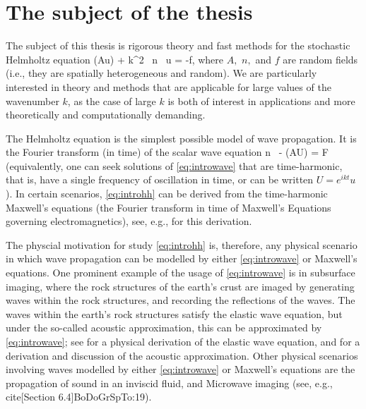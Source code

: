 \section{The subject of the thesis}

The subject of this thesis is rigorous theory and fast methods for the stochastic Helmholtz equation
\beq\label{eq:introhh}
\grad \cdot \mleft(A\grad u\mright) + k^2 \, n \, u = -f,
\eeq
where $A,$ $n,$ and $f$ are random fields (i.e., they are spatially heterogeneous and random). We are particularly interested in theory and methods that are applicable for large values of the wavenumber $k$, as the case of large $k$ is both of interest in applications and more theoretically and computationally demanding.

The Helmholtz equation is the simplest possible model of wave propagation. It is the Fourier transform (in time) of the scalar wave equation
\beq\label{eq:introwave}
n \,  - \grad \cdot\mleft(A\grad U\mright) = F
\eeq
(equivalently, one can seek solutions of \eqref{eq:introwave} that are time-harmonic, that is, have a single frequency of oscillation in time, or can be written $U = e^{ikt}u$). In certain scenarios, 
\eqref{eq:introhh} can be derived from the time-harmonic Maxwell's equations (the Fourier transform in time of Maxwell's Equations governing electromagnetics), see, e.g., \cite{MoSp:19} for this derivation.

The physcial motivation for study \eqref{eq:introhh} is, therefore, any physical scenario in which wave propagation can be modelled by either \eqref{eq:introwave} or Maxwell's equations. One prominent example of the usage of \eqref{eq:introwave} is in subsurface imaging, where the rock structures of the earth's crust are imaged by generating waves within the rock structures, and recording the reflections of the waves. The waves within the earth's rock structures satisfy the elastic wave equation, but under the so-called acoustic approximation, this can be approximated by \eqref{eq:introwave}; see \cite[Section 1.2]{Ch:15} for a physical derivation of the elastic wave equation, and \cite[Section 1.2.6]{Ch:18} for a derivation and discussion of the acoustic approximation. Other physical scenarios involving waves modelled by either \eqref{eq:introwave} or Maxwell's equations are the propagation of sound in an inviscid fluid\cite[Section 2.1]{CoKr:13}, and Microwave imaging (see, e.g., cite[Section 6.4]{BoDoGrSpTo:19}).

